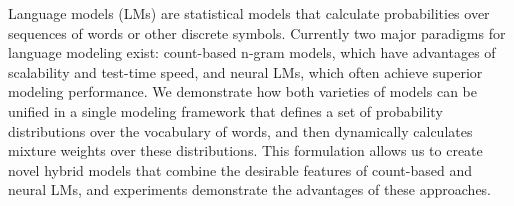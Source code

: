Language models (LMs) are statistical models that calculate probabilities over sequences of words or other discrete symbols. Currently two major paradigms for language modeling exist: count-based n-gram models, which have advantages of scalability and test-time speed, and neural LMs, which often achieve superior modeling performance. We demonstrate how both varieties of models can be unified in a single modeling framework that defines a set of probability distributions over the vocabulary of words, and then dynamically calculates mixture weights over these distributions. This formulation allows us to create novel hybrid models that combine the desirable features of count-based and neural LMs, and experiments demonstrate the advantages of these approaches.

